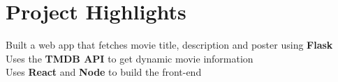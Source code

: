 \documentclass[]{Nikhil_Kadiyan_Resume}
\begin{document}

\section{Project Highlights}
\hrulefill



\pt Built a web app that fetches movie title, description and poster using \textbf{Flask} \\
\pt Uses the \textbf{TMDB API} to get dynamic movie information\\
\pt Uses \textbf{React} and \textbf{Node} to build the front-end\\
\sectionsep
\end{document}
